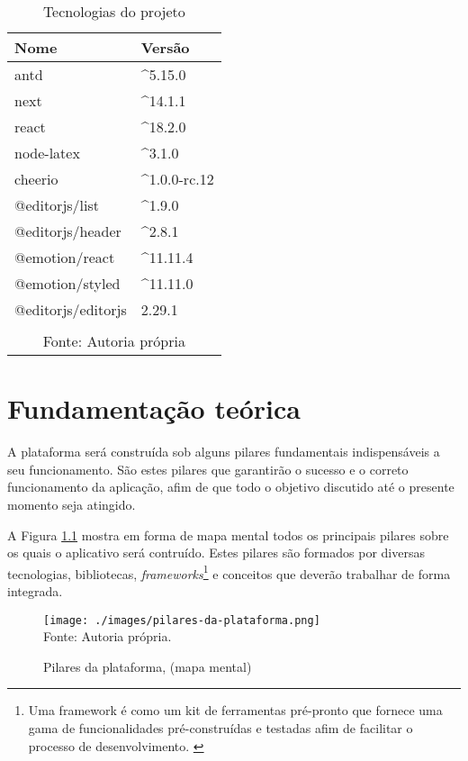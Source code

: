 \begin{table}[H]
    \centering
    \caption{Tecnologias do projeto}
    \label{tbl:tecnologias-projeto}
    \renewcommand{\arraystretch}{1.5}
    \begin{tabular}{p{3.2000cm} p{4.8000cm}}
        \hline
        \textbf{Nome} & \textbf{Versão} \\
        \hline
        antd & \textasciicircum 5.15.0 \\
		next & \textasciicircum 14.1.1 \\
		react & \textasciicircum 18.2.0 \\
		node-latex & \textasciicircum 3.1.0 \\
		cheerio & \textasciicircum 1.0.0-rc.12 \\
		@editorjs/list & \textasciicircum 1.9.0 \\
		@editorjs/header & \textasciicircum 2.8.1 \\
		@emotion/react & \textasciicircum 11.11.4 \\
		@emotion/styled & \textasciicircum 11.11.0 \\
		@editorjs/editorjs & 2.29.1 \\
        \hline
        \\\multicolumn{2}{c}{\fontsize{10pt}{12pt}Fonte: Autoria própria}
    \end{tabular}
\end{table}

\chapter{Fundamentação teórica}

A plataforma será construída sob alguns pilares fundamentais indispensáveis
a seu funcionamento. São estes pilares que garantirão o sucesso e o correto
funcionamento da aplicação, afim de que todo o objetivo discutido até o
presente momento seja atingido.

A
Figura \ref{fig:pilares-da-plataforma}
mostra em forma de mapa mental todos os principais pilares sobre os quais
o aplicativo será contruído. Estes pilares são formados por diversas
tecnologias, bibliotecas,
\textit{frameworks}\footnote{Uma framework é como um kit de ferramentas pré-pronto que fornece uma gama
    de funcionalidades pré-construídas e testadas afim de facilitar o processo
    de desenvolvimento. \cite{amazon-framework}
}
e conceitos que deverão trabalhar de forma integrada.

\begin{figure}[H]
    \centering
    \caption{Pilares da plataforma, (mapa mental)}
    \texttt{[image: ./images/pilares-da-plataforma.png]}
    \label{fig:pilares-da-plataforma} \\
    \textnormal{\fontsize{10pt}{12pt}Fonte: Autoria própria.}
\end{figure}

